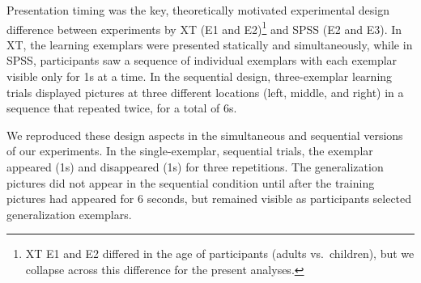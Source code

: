 \documentclass[english,floatsintext,man]{apa6}
\theoremstyle{definition}
\theoremstyle{definition}
\theoremstyle{definition}
\theoremstyle{remark}
\begin{document}
Presentation timing was the key, theoretically motivated experimental
design difference between experiments by XT (E1 and
E2)\footnote{XT E1 and E2 differed in the age of participants (adults vs.\ children), but we collapse across this difference for the present analyses.}
and SPSS (E2 and E3). In XT, the learning exemplars were presented
statically and simultaneously, while in SPSS, participants saw a
sequence of individual exemplars with each exemplar visible only for 1s
at a time. In the sequential design, three-exemplar learning trials
displayed pictures at three different locations (left, middle, and
right) in a sequence that repeated twice, for a total of 6s.

We reproduced these design aspects in the simultaneous and sequential
versions of our experiments. In the single-exemplar, sequential trials,
the exemplar appeared (1s) and disappeared (1s) for three repetitions.
The generalization pictures did not appear in the sequential condition
until after the training pictures had appeared for 6 seconds, but
remained visible as participants selected generalization exemplars.
\end{document}
